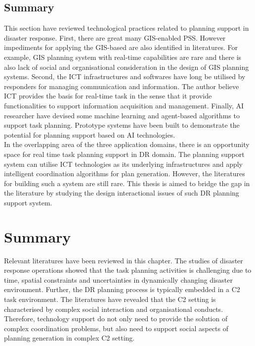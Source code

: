 \subsection{Summary}
This section have reviewed technological practices related to planning support in disaster response. First, there are great many \ac{GIS}-enabled \acf{PSS}. However impediments for applying the \ac{GIS}-based are also identified in literatures. For example, \ac{GIS} planning system with real-time capabilities are rare and there is also lack of social and organisational consideration in the design of \ac{GIS} planning systems. Second, the \ac{ICT} infrastructures and softwares have long be utilised by responders for managing communication and information. The author believe \ac{ICT} provides the basis for real-time task in the sense that it provide functionalities to support information acquisition and management. Finally, \ac{AI} researcher have devised some machine learning and agent-based algorithms to support task planning. Prototype systems have been built to demonstrate the potential for planning support based on \ac{AI} technologies.\\ 

In the overlapping area of the three application domains, there is an opportunity space for real time task planning support in \ac{DR} domain. The planning support system can utilise \ac{ICT} technologies as its underlying infrastructures and apply intelligent coordination algorithms for plan generation. However, the literatures for building such a system are still rare. This thesis is aimed to bridge the gap in the literature by studying the design interactional issues of such \ac{DR} planning support system.\\

\section{Summary}
Relevant literatures have been reviewed in this chapter. The studies of disaster response operations showed that the task planning activities is challenging due to time, spatial constraints and uncertainties in dynamically changing disaster environment. Further, the \ac{DR} planning process is typically embedded in a \acf{C2} task environment. The literatures have revealed that the \ac{C2} setting is characterised by complex social interaction and organisational conducts. Therefore, technology support do not only need to provide the solution of complex coordination problems, but also need to support social aspects of planning generation in complex \ac{C2} setting. \\

